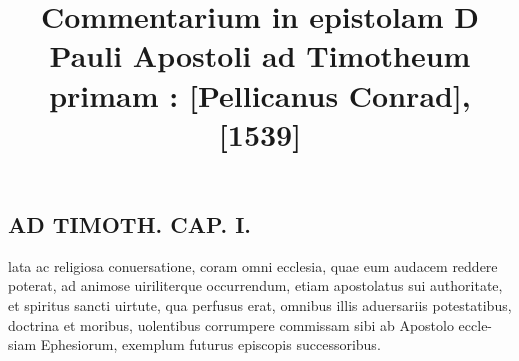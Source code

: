 \documentclass{article}
\begin{document}
\date{}
        \title{Commentarium in epistolam D Pauli Apostoli ad Timotheum primam : [Pellicanus Conrad], [1539]}
\maketitle
\tableofcontents
\clearpage
\begin{pages} 
\beginnumbering
        
\section*{AD TIMOTH. CAP. I. }
\marginpar{[ p.479 ]}\pstart lata ac religiosa conuersatione, coram omni ecclesia, quae eum audacem reddere poterat, ad animose uiriliterque  occurrendum, etiam apostolatus sui authoritate, et spiritus sancti uirtute, qua perfusus erat, omnibus illis aduersariis potestatibus, doctrina et moribus, uolentibus corrumpere commissam sibi ab Apostolo eccle- siam Ephesiorum, exemplum futurus episcopis successoribus.  \pend
{}
{}

\end{pages}
\end{document}
